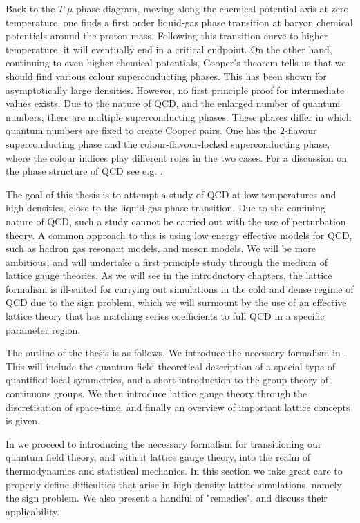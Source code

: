 Back to the $T$-$\mu$ phase diagram, moving along the chemical potential axis at
zero temperature, one finds a first order liquid-gas phase transition at baryon
chemical potentials around the proton mass.  Following this transition curve to
higher temperature, it will eventually end in a critical endpoint. On the other
hand, continuing to even higher chemical potentials, Cooper's theorem tells us
that we should find various colour superconducting phases. This has been shown
for asymptotically large densities. However, no first principle proof for
intermediate values exists. Due to the nature of QCD, and the enlarged number of
quantum numbers, there are multiple superconducting phases. These phases differ
in which quantum numbers are fixed to create Cooper pairs. One has the
$2$-flavour superconducting phase and the colour-flavour-locked superconducting
phase, where the colour indices play different roles in the two cases. For a
discussion on the phase structure of QCD see e.g.
\citep{Rajagopal:2000wf,Rischke:2003mt}.

The goal of this thesis is to attempt a study of QCD at low temperatures and
high densities, close to the liquid-gas phase transition. Due to the confining
nature of QCD, such a study cannot be carried out with the use of perturbation
theory. A common approach to this is using low energy effective models
for QCD, such as hadron gas resonant models, and meson models. We will be more
ambitious, and will undertake a first principle study through the medium
of lattice gauge theories. As we will see in the introductory chapters, the
lattice formalism is ill-suited for carrying out simulations in the cold and
dense regime of QCD due to the sign problem, which we will surmount by the use
of an effective lattice theory that has matching series coefficients to full QCD
in a specific parameter region.

The outline of the thesis is as follows. We introduce the necessary
formalism in . This will include the quantum field theoretical
description of a special type of quantified local symmetries, and a short
introduction to the group theory of continuous groups. We then introduce lattice
gauge theory through the discretisation of space-time, and finally an overview
of important lattice concepts is given.

In  we proceed to introducing the necessary formalism for
transitioning our quantum field theory, and with it lattice gauge theory, into
the realm of thermodynamics and statistical mechanics. In this section we take
great care to properly define difficulties that arise in high density lattice
simulations, namely the sign problem. We also present a handful of "remedies",
and discuss their applicability.

